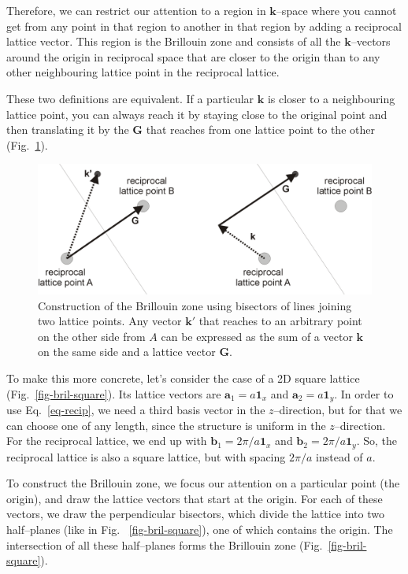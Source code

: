 Therefore, we can restrict our attention to a region in ${\mathbf k}$--space where you cannot get from any point in that region to another in that region by adding a reciprocal lattice vector. This region is the Brillouin zone and consists of all the ${\mathbf k}$--vectors around the origin in reciprocal space that are closer to the origin than to any other neighbouring lattice point in the reciprocal lattice.

These two definitions are equivalent. If a particular ${\mathbf k}$ is closer to a neighbouring lattice point, you can always reach it by staying close to the original point and then translating it by the ${\mathbf G}$ that reaches from one lattice point to the other (Fig.~\ref{fig-bril-bisector}).

\begin{figure}
\centering
\includegraphics{symmetry/figures/bisector}
\caption{Construction of the Brillouin zone using bisectors of lines joining two lattice points. Any vector ${\mathbf k}'$ that reaches to an arbitrary point on the other side from $A$ can be expressed as the sum of a vector ${\mathbf k}$ on the same side and a lattice vector ${\mathbf G}$.}
\label{fig-bril-bisector}
\end{figure}

To make this more concrete, let's consider the case of a 2D square lattice (Fig.~\ref{fig-bril-square}). Its lattice vectors are ${\mathbf a}_1 = a {\mathbf 1}_x$ and ${\mathbf a}_2 = a {\mathbf 1}_y$. In order to use Eq.~\ref{eq-recip}, we need a third basis vector in the $z$--direction, but for that we can choose one of any length, since the structure is uniform in the $z$--direction. For the reciprocal lattice, we end up with  ${\mathbf b}_1 = 2 \pi / a {\mathbf 1}_x$ and ${\mathbf b}_2 = 2 \pi / a {\mathbf 1}_y$. So, the reciprocal lattice is also a square lattice, but with spacing $2 \pi / a$ instead of $a$.

To construct the Brillouin zone, we focus our attention on a particular point (the origin), and draw the lattice vectors that start at the origin. For each of these vectors, we draw the perpendicular bisectors, which divide the lattice into two half--planes (like in Fig.~ \ref{fig-bril-square}), one of which contains the origin. The intersection of all these half--planes forms the Brillouin zone (Fig.~\ref{fig-bril-square}).

